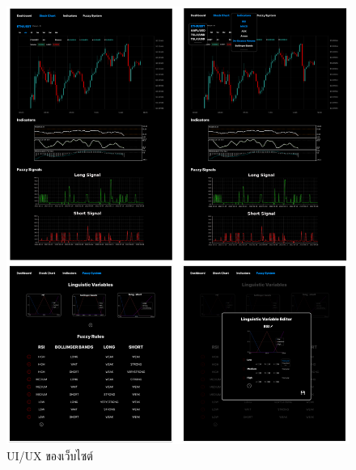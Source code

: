 \begin{figure}[ht]
    \centering
    \includegraphics[width=\textwidth]{images/web_uiux.png}
    \caption{UI/UX ของเว็บไซต์}
\end{figure}


